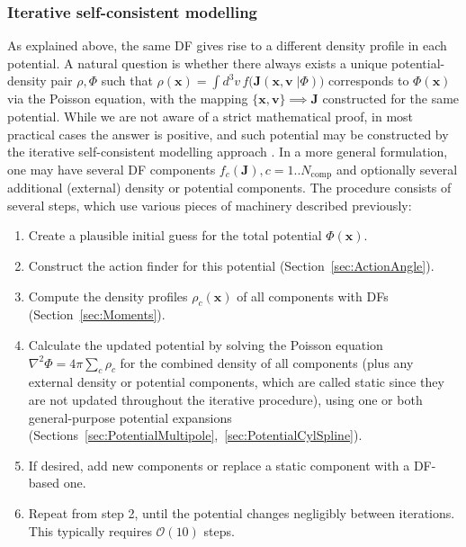 \documentclass[12pt]{article}
\newcommand{\bv}{\boldsymbol{v}}
\newcommand{\bx}{\boldsymbol{x}}
\newcommand{\bJ}{\boldsymbol{J}}
\begin{document}
\subsubsection{Iterative self-consistent modelling}  \label{sec:SCM}

As explained above, the same DF gives rise to a different density profile in each potential. A natural question is whether there always exists a unique potential-density pair $\rho,\Phi$ such that $\rho(\bx)=\int d^3v\,f\big(\bJ(\bx,\bv\;|\Phi)\big)$ corresponds to $\Phi(\bx)$ via the Poisson equation, with the mapping $\{\bx,\bv\}\implies \bJ$ constructed for the same potential.
While we are not aware of a strict mathematical proof, in most practical cases the answer is positive, and such potential may be constructed by the iterative self-consistent modelling approach \cite{Binney2014,Piffl2015}. 
In a more general formulation, one may have several DF components $f_c(\bJ), c=1..N_\mathrm{comp}$ and optionally several additional (external) density or potential components. The procedure consists of several steps, which use various pieces of machinery described previously:
\begin{enumerate}  \setlength{\parskip}{2pt} \setlength{\itemsep}{2pt}
\item Create a plausible initial guess for the total potential $\Phi(\bx)$.
\item Construct the action finder for this potential (Section~\ref{sec:ActionAngle}).
\item Compute the density profiles $\rho_c(\bx)$ of all components with DFs (Section~\ref{sec:Moments}).
\item Calculate the updated potential by solving the Poisson equation $\nabla^2\Phi = 4\pi\sum_c\rho_c$ for the combined density of all components (plus any external density or potential components, which are called static since they are not updated throughout the iterative procedure), using one or both general-purpose potential expansions (Sections~\ref{sec:PotentialMultipole},~\ref{sec:PotentialCylSpline}).
\item If desired, add new components or replace a static component with a DF-based one.
\item Repeat from step 2, until the potential changes negligibly between iterations. This typically requires $\mathcal{O}(10)$ steps.
\end{enumerate}
\end{document}

